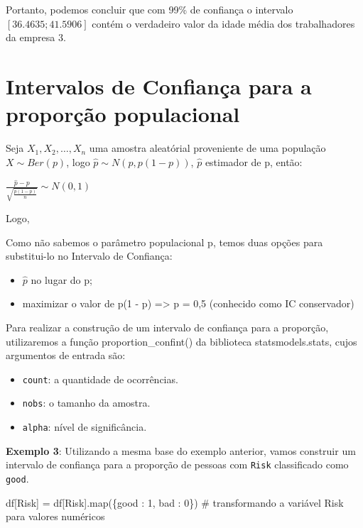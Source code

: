 \documentclass[
  letterpaper,
  DIV=11,
  numbers=noendperiod]{scrreprt}
\newenvironment{Shaded}{\begin{snugshade}}{\end{snugshade}}
\newcommand{\BuiltInTok}[1]{\textcolor[rgb]{0.00,0.23,0.31}{#1}}
\newcommand{\CommentTok}[1]{\textcolor[rgb]{0.37,0.37,0.37}{#1}}
\newcommand{\DecValTok}[1]{\textcolor[rgb]{0.68,0.00,0.00}{#1}}
\newcommand{\NormalTok}[1]{\textcolor[rgb]{0.00,0.23,0.31}{#1}}
\newcommand{\OperatorTok}[1]{\textcolor[rgb]{0.37,0.37,0.37}{#1}}
\newcommand{\StringTok}[1]{\textcolor[rgb]{0.13,0.47,0.30}{#1}}
\providecommand{\tightlist}{%
  \setlength{\itemsep}{0pt}\setlength{\parskip}{0pt}}\usepackage{longtable,booktabs,array}
\begin{document}
Portanto, podemos concluir que com 99\% de confiança o intervalo
\([36.4635;41.5906]\) contém o verdadeiro valor da idade média dos
trabalhadores da empresa 3.


\hypertarget{intervalos-de-confianuxe7a-para-a-proporuxe7uxe3o-populacional}{%
\chapter{Intervalos de Confiança para a proporção
populacional}\label{intervalos-de-confianuxe7a-para-a-proporuxe7uxe3o-populacional}}

Seja \({X_{1}, X_{2}, …, X_{n}}\) uma amostra aleatórial proveniente de
uma população \({X \sim Ber(p)}\), logo \({\hat{p} \sim N(p, p(1-p))}\),
\({\hat{p}}\) estimador de p, então:

\(\frac{\hat{p} - p}{\sqrt{\frac{p(1-p)}{n}}} \sim N(0, 1)\)

Logo,

Como não sabemos o parâmetro populacional p, temos duas opções para
substitui-lo no Intervalo de Confiança:

\begin{itemize}
\item
  \({\hat{p}}\) no lugar do p;
\item
  maximizar o valor de p(1 - p) =\textgreater{} p = 0,5 (conhecido como
  IC conservador)
\end{itemize}

Para realizar a construção de um intervalo de confiança para a
proporção, utilizaremos a função proportion\_confint() da biblioteca
statsmodels.stats, cujos argumentos de entrada são:

\begin{itemize}
\tightlist
\item
  \texttt{count}: a quantidade de ocorrências.
\item
  \texttt{nobs}: o tamanho da amostra.
\item
  \texttt{alpha}: nível de significância.
\end{itemize}

\textbf{Exemplo 3}: Utilizando a mesma base do exemplo anterior, vamos
construir um intervalo de confiança para a proporção de pessoas com
\texttt{Risk} classificado como \texttt{good}.

\begin{Shaded}
\begin{Highlighting}[]
\NormalTok{df[}\StringTok{\textquotesingle{}Risk\textquotesingle{}}\NormalTok{] }\OperatorTok{=}\NormalTok{ df[}\StringTok{\textquotesingle{}Risk\textquotesingle{}}\NormalTok{].}\BuiltInTok{map}\NormalTok{(\{}\StringTok{\textquotesingle{}good\textquotesingle{}}\NormalTok{ : }\DecValTok{1}\NormalTok{, }\StringTok{\textquotesingle{}bad\textquotesingle{}}\NormalTok{ : }\DecValTok{0}\NormalTok{\}) }\CommentTok{\# transformando a variável Risk para valores numéricos}
\end{Highlighting}
\end{Shaded}
\end{document}
